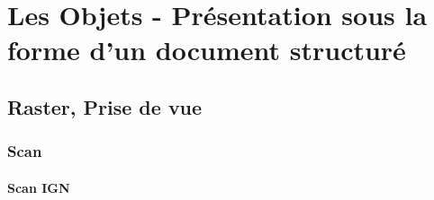 \documentclass[12pt,titlepage]{book}
\begin{document}
\section{Les Objets - Présentation sous la forme d'un document structuré}

\vspace{\baselineskip}


\subsection{Raster, Prise de vue}
\subsubsection{\large Scan}
\paragraph{Scan IGN}
\noindent
\vspace{\baselineskip}
\end{document}
